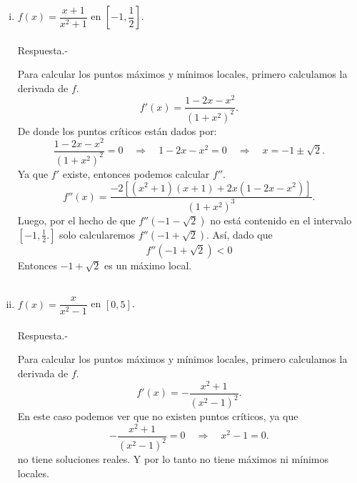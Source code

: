 \begin{enumerate}[\bfseries 1.]
\begin{enumerate}[(i)]
	    \item $f(x)=\dfrac{x+1}{x^2+1}$ en $\left[-1,\dfrac{1}{2}\right]$.\\\\
		Respuesta.-\; 
		\begin{center}
		\end{center}
		Para calcular los puntos máximos y mínimos locales, primero calculamos la derivada de $f$.
		$$f'(x)=\dfrac{1-2x-x^2}{\left(1+x^2\right)^2}.$$
		De donde los puntos críticos están dados por:
		$$\dfrac{1-2x-x^2}{\left(1+x^2\right)^2}=0 \quad \Rightarrow \quad 1-2x-x^2=0 \quad \Rightarrow \quad x=-1\pm \sqrt{2}.$$
		Ya que $f'$ existe, entonces podemos calcular $f''$.
		$$f''(x)=\dfrac{-2\left[(x^2+1)(x+1)+2x(1-2x-x^2)\right]}{\left(1+x^2\right)^3}.$$
		Luego, por el hecho de que $f''(-1-\sqrt{2})$ no está contenido en el intervalo $\left[-1,\frac{1}{2}.\right]$ solo calcularemos $f''\left(-1+\sqrt{2}\right)$. Así, dado que 
		$$f''\left(-1+\sqrt{2}\right)<0$$
		Entonces $-1+\sqrt{2}$ es un máximo local.\\\\

	    \item $f(x)=\dfrac{x}{x^2-1}$ en $[0,5]$.\\\\
		Respuesta.-\; 
		\begin{center}
		\end{center}
		Para calcular los puntos máximos y mínimos locales, primero calculamos la derivada de $f$.
		$$f'(x)=-\dfrac{x^2+1}{\left(x^2-1\right)^2}.$$
		En este caso podemos ver que no existen puntos críticos, ya que
		$$-\dfrac{x^2+1}{\left(x^2-1\right)^2}=0 \quad \Rightarrow \quad x^2-1=0.$$
		no tiene soluciones reales. Y por lo tanto no tiene máximos ni mínimos locales.\\\\


\end{enumerate}
\end{enumerate}
